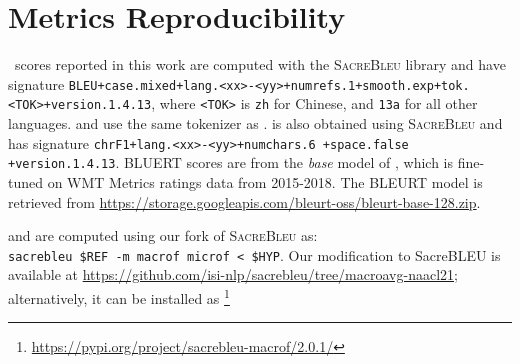 \section{Metrics Reproducibility}
\label{sec:appmetrics}

\bleu\ scores reported in this work are computed with the \textsc{SacreBleu} library and have signature \texttt{\small BLEU+case.mixed+lang.<xx>-<yy>+numrefs.1+smooth.exp+tok.<TOK>+version.1.4.13}, where \texttt{<TOK>} is \texttt{zh} for Chinese, and \texttt{13a} for all other languages.  and  use the same tokenizer as \bleu.
 is also obtained using \textsc{SacreBleu} and has signature \texttt{\small chrF1+lang.<xx>-<yy>+numchars.6 +space.false +version.1.4.13}.
BLUERT scores are from the \textit{base} model of \citet{sellam-etal-2020-bleurt}, which is fine-tuned on WMT Metrics ratings data from 2015-2018.
The BLEURT model is retrieved from \url{https://storage.googleapis.com/bleurt-oss/bleurt-base-128.zip}.

 and  are computed using our fork of \textsc{SacreBleu} as:\\
\texttt{sacrebleu \$REF -m macrof microf < \$HYP}. 
Our modification to SacreBLEU is available at \url{https://github.com/isi-nlp/sacrebleu/tree/macroavg-naacl21}; alternatively, it can be installed as \footnote{\url{https://pypi.org/project/sacrebleu-macrof/2.0.1/}}

